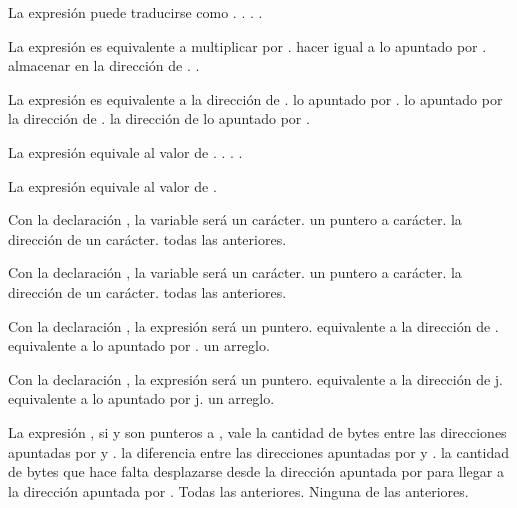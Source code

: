 \begin{preguntas}
\question La expresión  puede traducirse como
\choice {}.
\correctchoice {}.
\choice {}.
\choice {}
\choice {}.

\question La expresión  es equivalente a
\choice multiplicar  por .
\correctchoice hacer  igual a lo apuntado por .
\choice almacenar en  la dirección de .
\choice {}.

\question La expresión  es equivalente a
\choice la dirección de .
\choice lo apuntado por .
\choice lo apuntado por la dirección de .
\correctchoice la dirección de lo apuntado por .

\question La expresión  equivale al valor de 
\choice {}.
\choice {}.
\correctchoice {}.
\choice {}.

\question La expresión  equivale al valor de 
\choice {}
\choice {}
\correctchoice {}
\choice {}.

\question Con la declaración , la variable  será
\choice un carácter.
\correctchoice un puntero a carácter.
\choice la dirección de un carácter.
\choice todas las anteriores.

\question Con la declaración , la variable  será
\correctchoice un carácter. 
\choice un puntero a carácter.
\choice la dirección de un carácter.
\choice todas las anteriores.

\question Con la declaración , la expresión  será
\choice un puntero.
\correctchoice equivalente a la dirección de .
\choice equivalente a lo apuntado por .
\choice un arreglo.

\question Con la declaración , la expresión  será
\choice un puntero.
\choice equivalente a la dirección de j.
\correctchoice equivalente a lo apuntado por j.
\choice un arreglo.

\question La expresión , si  y  son punteros a , vale
\choice la cantidad de bytes entre las direcciones apuntadas por  y .
\choice la diferencia entre las direcciones apuntadas por  y .
\choice la cantidad de bytes que hace falta desplazarse desde la dirección apuntada por  para llegar a la dirección apuntada por .
\correctchoice Todas las anteriores.
\choice Ninguna de las anteriores.


\end{preguntas}
